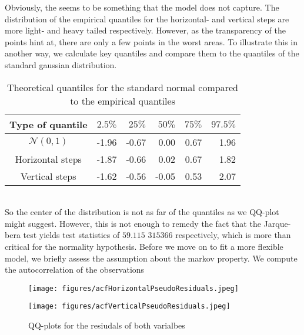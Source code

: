 Obviously, the seems to be something that the model does not capture. The distribution of the empirical quantiles for the horizontal- and vertical steps are more light- and heavy tailed respectively. However, as the transparency of the points hint at, there are only a few points in the worst areas. To illustrate this in another way, we calculate key quantiles and compare them to the quantiles of the standard gaussian distribution.
\begin{table}[h]
    \centering
    \begin{tabular}{crrrrr}
      \hline
     Type of quantile & $2.5\%$ & $25\%$ & $50\%$ & $75\%$ & $97.5\%$ \\ 
     \hline
     $\mathcal{N}(0,1)$ & -1.96 & -0.67 & 0.00 & 0.67 & 1.96 \\ 
     Horizontal steps & -1.87 & -0.66 & 0.02 & 0.67 & 1.82 \\ 
     Vertical steps & -1.62 & -0.56 & -0.05 & 0.53 & 2.07 \\ 
        \hline
    \end{tabular}
    \caption{Theoretical quantiles for the standard normal compared to the empirical quantiles}
\end{table}\\
So the center of the distribution is not as far of the quantiles as we QQ-plot might suggest. However, this is not enough to remedy the fact that the Jarque-bera test yields test statistics of $59.115$ $315366$ respectively, which is more than critical for the normality hypothesis. Before we move on to fit a more flexible model, we briefly assess the assumption about the markov property. We compute the autocorrelation of the observations 
\begin{figure}[h]
    \centering
    \begin{minipage}[b]{0.49\textwidth}
      \texttt{[image: figures/acfHorizontalPseudoResiduals.jpeg]}
    \end{minipage}
    \hfill
    \begin{minipage}[b]{0.49\textwidth}
      \texttt{[image: figures/acfVerticalPseudoResiduals.jpeg]}
    \end{minipage}
    \caption{QQ-plots for the resiudals of both varialbes}
    \label{combinedACFPlots}
\end{figure}\\